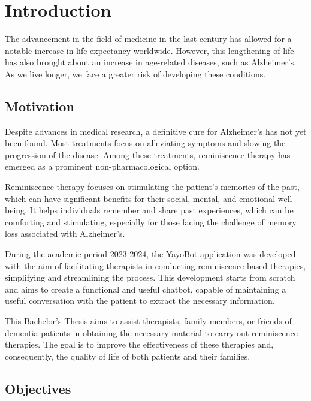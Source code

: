 \chapter*{Introduction}
\label{chap:introduction}


The advancement in the field of medicine in the last century has allowed for a notable increase in life expectancy worldwide. However, this lengthening of life has also brought about an increase in age-related diseases, such as Alzheimer's. As we live longer, we face a greater risk of developing these conditions.

\section{Motivation}

Despite advances in medical research, a definitive cure for Alzheimer's has not yet been found. Most treatments focus on alleviating symptoms and slowing the progression of the disease. Among these treatments, reminiscence therapy has emerged as a prominent non-pharmacological option.

Reminiscence therapy focuses on stimulating the patient's memories of the past, which can have significant benefits for their social, mental, and emotional well-being. It helps individuals remember and share past experiences, which can be comforting and stimulating, especially for those facing the challenge of memory loss associated with Alzheimer's.

During the academic period 2023-2024, the YayoBot application was developed with the aim of facilitating therapists in conducting reminiscence-based therapies, simplifying and streamlining the process. This development starts from scratch and aims to create a functional and useful chatbot, capable of maintaining a useful conversation with the patient to extract the necessary information.

This Bachelor's Thesis aims to assist therapists, family members, or friends of dementia patients in obtaining the necessary material to carry out reminiscence therapies. The goal is to improve the effectiveness of these therapies and, consequently, the quality of life of both patients and their families.

\section{Objectives}

